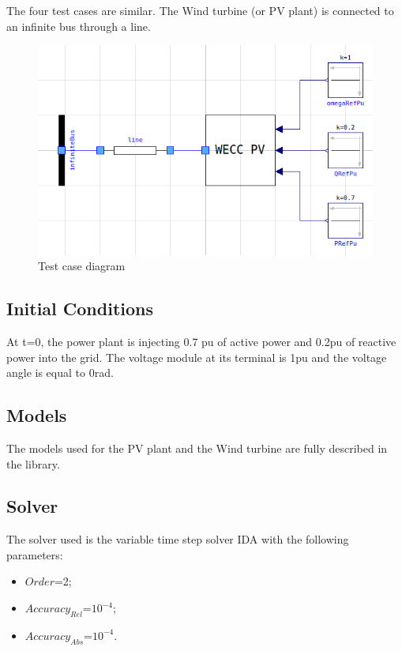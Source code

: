 \documentclass[a4paper, 12pt]{report}
\begin{document}
\par The four test cases are similar. The Wind turbine (or PV plant) is connected to an infinite bus through a line.

\begin{figure}[H]
  \includegraphics[width=\textwidth]{WECC.png}
  \caption{Test case diagram}
\end{figure}

\subsection{Initial Conditions}

\par At t=0, the power plant is injecting 0.7 pu of active power and 0.2pu of reactive power into the grid. The voltage module at its terminal is 1pu and the voltage angle is equal to 0rad.

\subsection{Models}

\par The models used for the PV plant and the Wind turbine are fully described in the \Dynawo library.

\subsection{Solver}

\par The solver used is the variable time step solver IDA with the following parameters:
\begin{itemize}
\item $Order$=2;
\item $Accuracy_{Rel}$=$10^{-4}$;
\item $Accuracy_{Abs}$=$10^{-4}$.
\end{itemize}
\end{document}
